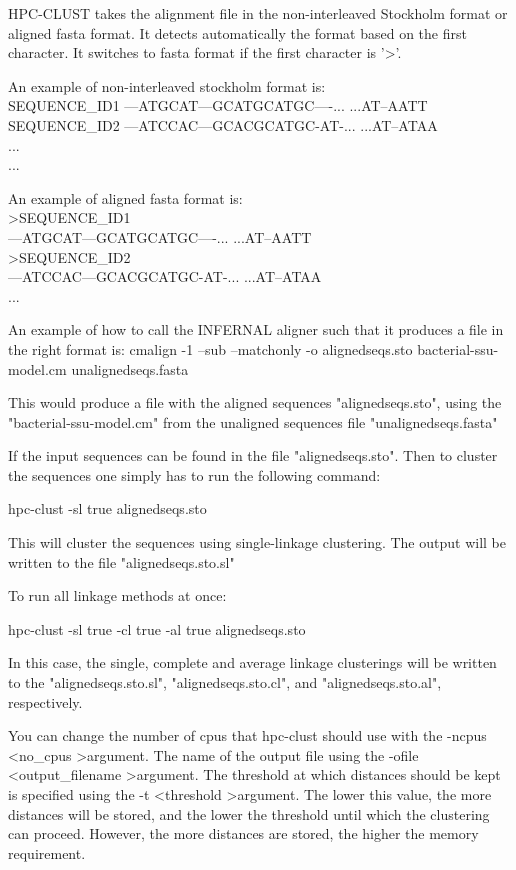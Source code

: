\documentclass[10pt,a4paper]{article}
\begin{document}
HPC-CLUST takes the alignment file in the non-interleaved Stockholm format or aligned fasta format.
It detects automatically the format based on the first character. It switches to fasta format if the first
character is '\textgreater'.

An example of non-interleaved stockholm format is:\\
SEQUENCE\_ID1      ---ATGCAT---GCATGCATGC----... ...AT--AATT\\
SEQUENCE\_ID2      ---ATCCAC---GCACGCATGC-AT-... ...AT--ATAA\\
...\\
...

An example of aligned fasta format is:\\
{\textgreater}SEQUENCE\_ID1\\
---ATGCAT---GCATGCATGC----... ...AT--AATT\\
{\textgreater}SEQUENCE\_ID2\\
---ATCCAC---GCACGCATGC-AT-... ...AT--ATAA\\
...


An example of how to call the INFERNAL aligner such that it produces a file in the
right format is:
cmalign -1 --sub --matchonly -o alignedseqs.sto bacterial-ssu-model.cm unalignedseqs.fasta

This would produce a file with the aligned sequences "alignedseqs.sto", using the
"bacterial-ssu-model.cm" from the unaligned sequences file "unalignedseqs.fasta"

If the input sequences can be found in the file "alignedseqs.sto". Then to cluster the
sequences one simply has to run the following command:

hpc-clust -sl true alignedseqs.sto

This will cluster the sequences using single-linkage clustering. The output will be written
to the file "alignedseqs.sto.sl"

To run all linkage methods at once:

hpc-clust -sl true -cl true -al true alignedseqs.sto

In this case, the single, complete and average linkage clusterings will be written to the
"alignedseqs.sto.sl", "alignedseqs.sto.cl", and "alignedseqs.sto.al", respectively.

You can change the number of cpus that hpc-clust should use with the -ncpus \textless no\_cpus \textgreater argument.
The name of the output file using the -ofile \textless output\_filename \textgreater argument.
The threshold at which distances should be kept is specified using the -t \textless threshold \textgreater argument.
The lower this value, the more distances will be stored, and the lower the threshold until which
the clustering can proceed. However, the more distances are stored, the higher the memory 
requirement.
\end{document}

